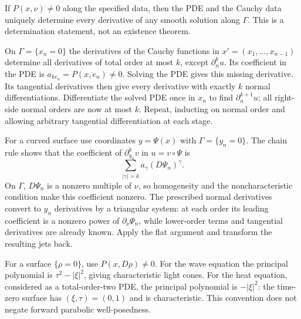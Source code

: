 \begin{theorem}
If $P(x,\nu)\ne0$ along the specified data, then the PDE and the
Cauchy data uniquely determine every derivative of any smooth solution
along $\Gamma$.
This is a determination statement, not an existence theorem.
\end{theorem}
\begin{expandedproof}
On $\Gamma=\{x_n=0\}$ the derivatives of the Cauchy functions in
$x'=(x_1,\ldots,x_{n-1})$ determine all derivatives of total order at
most $k$, except $\partial_n^ku$.
Its coefficient in the PDE is $a_{ke_n}=P(x,e_n)\ne0$.
Solving the PDE gives this missing derivative.
Its tangential derivatives then give every derivative with exactly
$k$ normal differentiations.
Differentiate the solved PDE once in $x_n$ to find
$\partial_n^{k+1}u$; all right-side normal orders are now at most $k$.
Repeat, inducting on normal order and allowing arbitrary tangential
differentiation at each stage.

For a curved surface use coordinates $y=\Psi(x)$ with
$\Gamma=\{y_n=0\}$. The chain rule shows that the coefficient of
$\partial_{y_n}^kv$ in $u=v\circ\Psi$ is
\[
 \sum_{|\gamma|=k}a_\gamma(D\Psi_n)^\gamma .
\]
On $\Gamma$, $D\Psi_n$ is a nonzero multiple of $\nu$, so homogeneity
and the noncharacteristic condition make this coefficient nonzero.
The prescribed normal derivatives convert to $y_n$ derivatives by
a triangular system: at each order its leading coefficient is a
nonzero power of $\partial_\nu\Psi_n$, while lower-order terms and
tangential derivatives are already known.
Apply the flat argument and transform the resulting jets back.
\end{expandedproof}
\Needspace{45mm}
For a surface $\{\rho=0\}$, use $P(x,D\rho)\ne0$.
For the wave equation the principal polynomial is
$\tau^2-|\xi|^2$, giving characteristic light cones.
For the heat equation, considered as a total-order-two PDE,
the principal polynomial is $-|\xi|^2$:
the time-zero surface has $(\xi,\tau)=(0,1)$ and is characteristic.
This convention does not negate forward parabolic well-posedness.

\Needspace{35mm}
